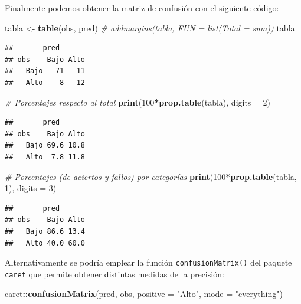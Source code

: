 \documentclass[
  spanish,
]{book}
\newenvironment{Shaded}{\begin{snugshade}}{\end{snugshade}}
\newcommand{\CommentTok}[1]{\textcolor[rgb]{0.56,0.35,0.01}{\textit{#1}}}
\newcommand{\DataTypeTok}[1]{\textcolor[rgb]{0.13,0.29,0.53}{#1}}
\newcommand{\DecValTok}[1]{\textcolor[rgb]{0.00,0.00,0.81}{#1}}
\newcommand{\KeywordTok}[1]{\textcolor[rgb]{0.13,0.29,0.53}{\textbf{#1}}}
\newcommand{\NormalTok}[1]{#1}
\newcommand{\OperatorTok}[1]{\textcolor[rgb]{0.81,0.36,0.00}{\textbf{#1}}}
\newcommand{\StringTok}[1]{\textcolor[rgb]{0.31,0.60,0.02}{#1}}
\theoremstyle{break}
\theoremstyle{definition}
\theoremstyle{definition}
\theoremstyle{definition}
\theoremstyle{remark}
\begin{document}
Finalmente podemos obtener la matriz de confusión con el siguiente código:

\begin{Shaded}
\begin{Highlighting}[]
\NormalTok{tabla <-}\StringTok{ }\KeywordTok{table}\NormalTok{(obs, pred)}
\CommentTok{# addmargins(tabla, FUN = list(Total = sum))}
\NormalTok{tabla}
\end{Highlighting}
\end{Shaded}

\begin{verbatim}
##       pred
## obs    Bajo Alto
##   Bajo   71   11
##   Alto    8   12
\end{verbatim}

\begin{Shaded}
\begin{Highlighting}[]
\CommentTok{# Porcentajes respecto al total}
\KeywordTok{print}\NormalTok{(}\DecValTok{100}\OperatorTok{*}\KeywordTok{prop.table}\NormalTok{(tabla), }\DataTypeTok{digits =} \DecValTok{2}\NormalTok{) }
\end{Highlighting}
\end{Shaded}

\begin{verbatim}
##       pred
## obs    Bajo Alto
##   Bajo 69.6 10.8
##   Alto  7.8 11.8
\end{verbatim}

\begin{Shaded}
\begin{Highlighting}[]
\CommentTok{# Porcentajes (de aciertos y fallos) por categorías}
\KeywordTok{print}\NormalTok{(}\DecValTok{100}\OperatorTok{*}\KeywordTok{prop.table}\NormalTok{(tabla, }\DecValTok{1}\NormalTok{), }\DataTypeTok{digits =} \DecValTok{3}\NormalTok{) }
\end{Highlighting}
\end{Shaded}

\begin{verbatim}
##       pred
## obs    Bajo Alto
##   Bajo 86.6 13.4
##   Alto 40.0 60.0
\end{verbatim}

Alternativamente se podría emplear la función \texttt{confusionMatrix()} del paquete \texttt{caret} que permite obtener distintas medidas de la precisión:

\begin{Shaded}
\begin{Highlighting}[]
\NormalTok{caret}\OperatorTok{::}\KeywordTok{confusionMatrix}\NormalTok{(pred, obs, }\DataTypeTok{positive =} \StringTok{"Alto"}\NormalTok{, }\DataTypeTok{mode =} \StringTok{"everything"}\NormalTok{)}
\end{Highlighting}
\end{Shaded}
\end{document}
